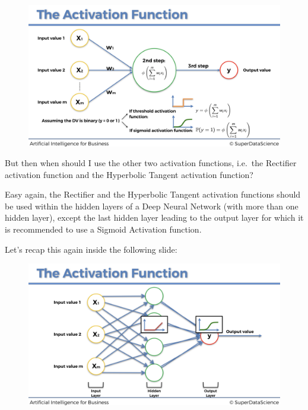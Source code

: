 \documentclass[]{book}
\begin{document}
\begin{figure}[!htbp]
        \begin{center}
            \includegraphics[scale=0.18]{ANN_14.png}
        \end{center}
\end{figure}

But then when should I use the other two activation functions, i.e.~the Rectifier activation function and the Hyperbolic Tangent activation function?

Easy again, the Rectifier and the Hyperbolic Tangent activation functions should be used within the hidden layers of a Deep Neural Network (with more than one hidden layer), except the last hidden layer leading to the output layer for which it is recommended to use a Sigmoid Activation function.

\newpage

Let's recap this again inside the following slide:

\begin{figure}[!htbp]
        \begin{center}
            \includegraphics[scale=0.18]{ANN_15.png}
        \end{center}
\end{figure}
\end{document}
